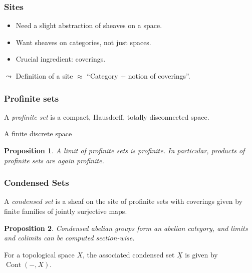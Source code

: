 \documentclass{beamer}
\newtheorem{proposition}{Proposition}
\DeclareMathOperator{\Cont}{Cont}
\begin{document}
\begin{frame}
    \frametitle{Sites}

    \begin{itemize}
        \item Need a slight abstraction of sheaves on a space.
        \item Want sheaves on categories, not just spaces.
        \item Crucial ingredient: coverings.
    \end{itemize}
    \medskip

    \pause
    $\leadsto$ Definition of a site $\approx $ ``Category + notion of coverings''.

\end{frame}

\begin{frame}
    \frametitle{Profinite sets}


    \begin{definition}
        A \emph{profinite set} is a compact, Hausdorff, totally disconnected space.
    \end{definition}
    \begin{example}
        A finite discrete space
    \end{example}
    \pause

    \begin{proposition}
        A limit of profinite sets is profinite.
        In particular, products of profinite sets
        are again profinite.
    \end{proposition}

\end{frame}

\begin{frame}
    \frametitle{Condensed Sets}

    \begin{definition}
        A \emph{condensed set} is a sheaf on the site of profinite sets
        with coverings given by finite families of jointly surjective maps.
    \end{definition}
    \medskip
    \pause[3]
    \begin{proposition}
        Condensed abelian groups form an abelian category, and
        limits and colimits can be computed section-wise.
    \end{proposition}

    \pause

    For a topological space $X$, the associated condensed set $\underline{X}$
    is given by $\Cont(-,X)$.
\end{frame}
\end{document}
